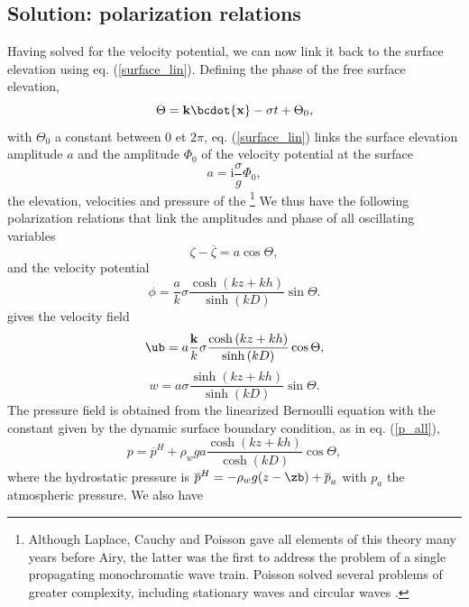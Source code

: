 \subsection{Solution: polarization relations}
Having solved for the velocity potential, we can now link it back to the surface elevation using eq. (\ref{surface_lin}). 
Defining the phase of the free surface elevation, 
\begin{equation}
   \Theta={\mathbf
k}\bcdot{\mathbf x}-\sigma t+ \Theta_0, \label{eq:phase}
\end{equation}
 with $\Theta_0$ a constant between 0
et $2\pi$, eq. (\ref{surface_lin}) links the surface elevation amplitude $a$ and the amplitude $\Phi_{0}$ of the velocity potential at the surface 
\begin{equation}
    a={\mathrm i}\frac{\sigma}{g}\Phi_{0},\label{afromPhi0}
\end{equation}
the elevation, velocities and pressure of the \cite{Airy1841}\footnote{Although 
Laplace, Cauchy and Poisson gave all elements of this theory many years 
before Airy, the latter was the first to address the problem of a single propagating monochromatic 
wave train. Poisson solved several problems of greater complexity, including stationary waves 
and circular waves \citep{Craik2004}.} We thus have  the  following 
polarization relations that link the amplitudes and phase of all oscillating variables 
\begin{equation}
    \zeta-\overline{\zeta}=a \cos \Theta,\label{polzeta}
\end{equation}
and the velocity potential 
\begin{equation}
    \phi=  \frac{a}{k}\sigma
    \frac{\cosh\left(kz+kh\right)}{\sinh\left(kD\right)}
    \sin \Theta.
      \label{potentielcos}
\end{equation}
gives the velocity field
\begin{equation}
    \ub= a \frac{{\mathbf k}}{k}\sigma
    \frac{\cosh\left(kz+kh\right)}{\sinh\left(kD\right)}
    \cos \Theta,
      \label{vitesse}
\end{equation}
\begin{equation}
    w=a \sigma
    \frac{\sinh\left(kz+kh\right)}{\sinh\left(kD\right)}
    \sin \Theta. \label{eq:w}
\end{equation}
The pressure field is obtained from the linearized Bernoulli equation with the constant 
given by the dynamic surface boundary condition, as in eq. (\ref{p_all}), 
\begin{equation}
    p=\overline{p}^H+\rho_w g a
    \frac{\cosh\left(kz+kh\right)}{\cosh\left(kD\right)}
    \cos \Theta,
      \label{pression}
\end{equation}
where the hydrostatic pressure is $\overline{p}^H=-\rho_w g
(z-\zb)+\overline{p}_a$ with ${p}_a$ the atmospheric pressure. 
We also have




